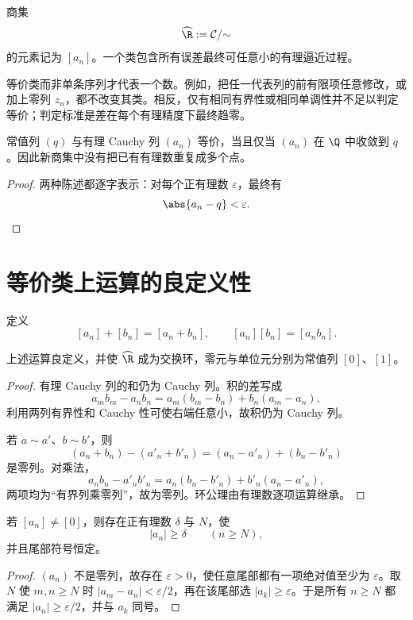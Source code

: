 商集
\[
 \widehat{\R}:=\mathcal C/{\sim}
\]
的元素记为 \([a_n]\)。一个类包含所有误差最终可任意小的有理逼近过程。

等价类而非单条序列才代表一个数。例如，把任一代表列的前有限项任意修改，或加上零列 \(z_n\)，都不改变其类。相反，仅有相同有界性或相同单调性并不足以判定等价；判定标准是差在每个有理精度下最终趋零。

\begin{proposition}
常值列 \((q)\) 与有理 Cauchy 列 \((a_n)\) 等价，当且仅当 \((a_n)\) 在 \(\Q\) 中收敛到 \(q\)。因此新商集中没有把已有有理数重复成多个点。
\end{proposition}

\begin{proof}
两种陈述都逐字表示：对每个正有理数 \(\varepsilon\)，最终有
\[
 \abs{a_n-q}<\varepsilon.
\]
\end{proof}

\section{等价类上运算的良定义性}

定义
\[
 [a_n]+[b_n]=[a_n+b_n],\qquad
 [a_n][b_n]=[a_nb_n].
\]

\begin{theorem}
上述运算良定义，并使 \(\widehat{\R}\) 成为交换环，零元与单位元分别为常值列 \([0]\)、\([1]\)。
\end{theorem}

\begin{proof}
有理 Cauchy 列的和仍为 Cauchy 列。积的差写成
\[
 a_mb_m-a_nb_n=a_m(b_m-b_n)+b_n(a_m-a_n),
\]
利用两列有界性和 Cauchy 性可使右端任意小，故积仍为 Cauchy 列。

若 \(a\sim a'\)、\(b\sim b'\)，则
\[
 (a_n+b_n)-(a'_n+b'_n)=(a_n-a'_n)+(b_n-b'_n)
\]
是零列。对乘法，
\[
 a_nb_n-a'_nb'_n=a_n(b_n-b'_n)+b'_n(a_n-a'_n),
\]
两项均为“有界列乘零列”，故为零列。环公理由有理数逐项运算继承。
\end{proof}

\begin{lemma}[非零类远离零]
若 \([a_n]\ne[0]\)，则存在正有理数 \(\delta\) 与 \(N\)，使
\[
 |a_n|\ge\delta\qquad(n\ge N),
\]
并且尾部符号恒定。
\end{lemma}

\begin{proof}
\((a_n)\) 不是零列，故存在 \(\varepsilon>0\)，使任意尾部都有一项绝对值至少为 \(\varepsilon\)。取 \(N\) 使 \(m,n\ge N\) 时 \(|a_m-a_n|<\varepsilon/2\)，再在该尾部选 \(|a_k|\ge\varepsilon\)。于是所有 \(n\ge N\) 都满足 \(|a_n|\ge\varepsilon/2\)，并与 \(a_k\) 同号。
\end{proof}

